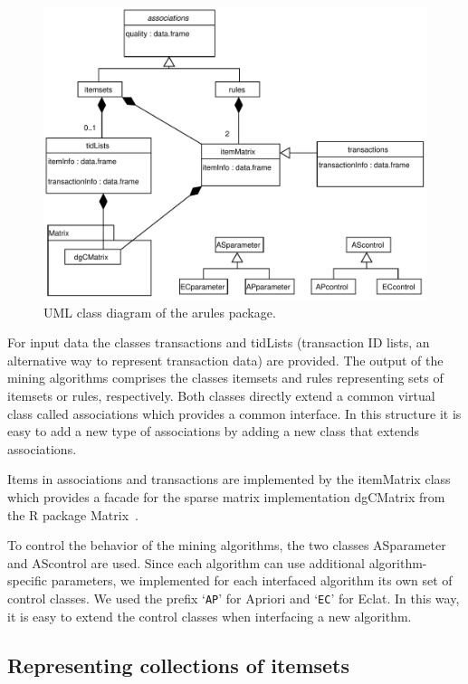 \documentclass[10pt,a4paper]{article}
\newcommand{\strong}[1]{{\normalfont\fontseries{b}\selectfont #1}}
\newcommand{\class}[1]{\mbox{\textsf{#1}}}
\newcommand{\pkg}[1]{\strong{#1}}
\newcommand{\samp}[1]{`\mbox{\texttt{#1}}'}
\newcommand{\proglang}[1]{\textsf{#1}}
\begin{document}
\begin{figure}[tp]
\centering
\includegraphics[width=12cm]{arules-classes}
\caption{UML class diagram \citep[see][]{misc:Fowler:2004} of the \pkg{arules}
package.\label{fig:arules-classes}}
\end{figure}

For input data the classes \class{transactions} and \class{tidLists}
(transaction ID lists, an alternative way to represent transaction data)
are provided.  The output of the mining algorithms comprises the classes
\class{itemsets} and \class{rules} representing sets of itemsets or
rules, respectively.  Both classes directly extend a common virtual
class called \class{associations} which provides a common interface.  In
this structure it is easy to add a new type of associations by adding a
new class that extends \class{associations}.

Items in \class{associations} and \class{transactions} are implemented
by the \class{itemMatrix} class which provides a facade for the sparse
matrix implementation \class{dgCMatrix} from the \proglang{R} package
\pkg{Matrix}~\citep{arules:Bates+Maechler:2005}.

To control the behavior of the mining algorithms, the two classes
\class{ASparameter} and \class{AScontrol} are used.  Since each
algorithm can use additional algorithm-specific parameters, we
implemented for each interfaced algorithm its own set of control
classes.  We used the prefix \samp{AP} for Apriori and \samp{EC} for
Eclat.  In this way, it is easy to extend the control classes when
interfacing a new algorithm.


\subsection{Representing collections of itemsets\label{sec:setrepresentation}}
\end{document}
